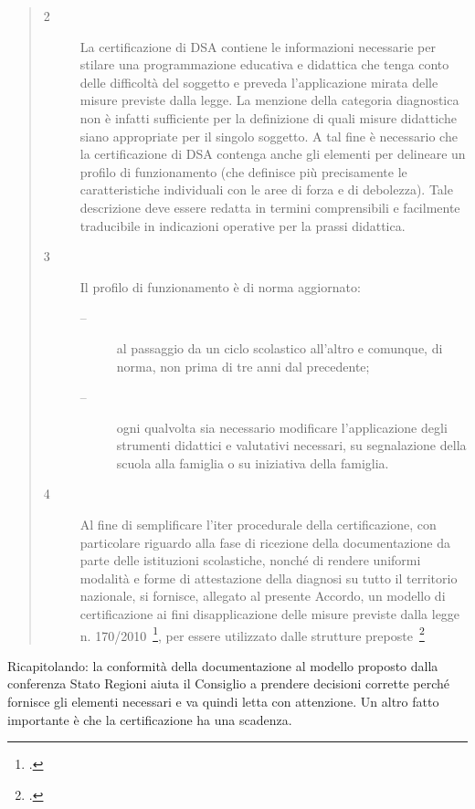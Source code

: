 \begin{quote}
\begin{description}
\begin{description}
		\item[2] La certificazione di DSA contiene le informazioni necessarie per stilare una programmazione educativa e didattica che tenga conto delle difficoltà del soggetto e preveda l'applicazione mirata delle misure previste dalla legge. La menzione della categoria diagnostica non è infatti sufficiente per la definizione di quali misure didattiche siano appropriate per il singolo soggetto. A tal fine è necessario che la certificazione di DSA contenga anche gli elementi per delineare un profilo di funzionamento (che definisce più precisamente le caratteristiche individuali con le aree di forza e di debolezza). Tale descrizione deve essere redatta in termini comprensibili e facilmente traducibile in indicazioni operative per la prassi didattica.
		\item[3]Il profilo di funzionamento è di norma aggiornato:
		\begin{description}
			\item[--]al passaggio da un ciclo scolastico all'altro e comunque, di norma, non prima di tre anni dal precedente;
			\item[--]ogni qualvolta sia necessario modificare l'applicazione degli strumenti didattici e valutativi necessari, su segnalazione della scuola alla famiglia o su iniziativa della famiglia.
		\end{description}
		\item[4] Al fine di semplificare l'iter procedurale della certificazione, con particolare riguardo alla fase di ricezione della documentazione da parte delle istituzioni scolastiche, nonché di rendere uniformi modalità e forme di attestazione della diagnosi su tutto il territorio nazionale, si fornisce, allegato al presente Accordo, un modello di certificazione ai fini disapplicazione delle misure previste dalla legge n. 170/2010~\footcite{legge170}, per essere utilizzato dalle strutture preposte~\footcite{ra_140_2012}
	\end{description}
\end{description}
\end{quote}
Ricapitolando: la conformità della documentazione al modello proposto dalla conferenza Stato Regioni aiuta il Consiglio a prendere decisioni corrette perché fornisce gli elementi necessari e va quindi letta con attenzione. Un altro fatto importante è che la certificazione ha una scadenza. %

